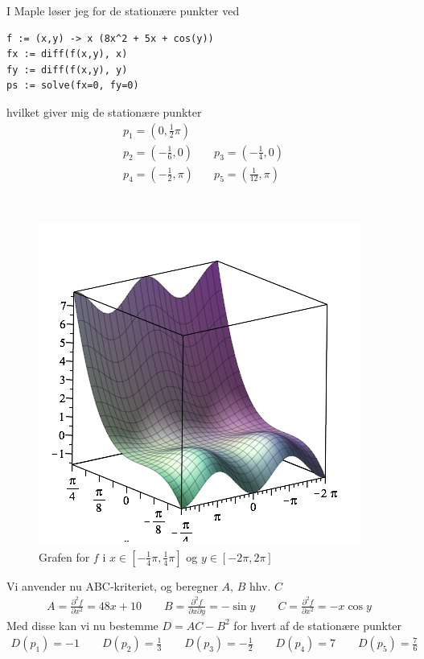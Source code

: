 \documentclass[11pt,a4paper]{article}
\newcommand{\colbreak}{\vfill{\ }\columnbreak}
\newcommand{\half}{\frac{1}{2}}
\begin{document}
\begin{multicols}{2}
I Maple løser jeg for de stationære punkter ved

\begin{lstlisting}
f := (x,y) -> x (8x^2 + 5x + cos(y))
fx := diff(f(x,y), x)
fy := diff(f(x,y), y)
ps := solve(fx=0, fy=0)
\end{lstlisting}

hvilket giver mig de stationære punkter
\begin{align*}
    p_1 = \left( 0, \half \pi \right) &\quad \\
    p_2 = \left( -\frac{1}{6}, 0 \right) &\quad
    p_3 = \left( -\frac{1}{4}, 0 \right) \quad \\
    p_4 = \left( -\half, \pi \right) &\quad
    p_5 = \left( \frac{1}{12}, \pi \right)
\end{align*}

\colbreak

\begin{figure}[H]
    \centering
    \includegraphics[scale=0.4]{figures/8-1-sadel.png}
    \caption{Grafen for $f$ i $x \in [-\frac{1}{4}\pi,\frac{1}{4}\pi]$ og
    $y \in [-2\pi,2\pi]$}
    \label{fig:8.1-sadel}
\end{figure}

\end{multicols}

Vi anvender nu ABC-kriteriet, og beregner $A$, $B$ hhv. $C$
\begin{align}
    A = \frac{\partial^2 f}{\partial x^2} = 48x + 10
    \qquad
    B = \frac{\partial^2 f}{\partial x \partial y} = -\sin y
    \qquad
    C = \frac{\partial^2 f}{\partial x^2} = -x \cos y
\end{align}
Med disse kan vi nu bestemme $D = AC - B^2$ for hvert af de stationære
punkter
\begin{align}
    D(p_1) = -1 \qquad
    D(p_2) = \frac{1}{3} \qquad
    D(p_3) = -\half \qquad
    D(p_4) = 7 \qquad
    D(p_5) = \frac{7}{6}
\end{align}
\end{document}
